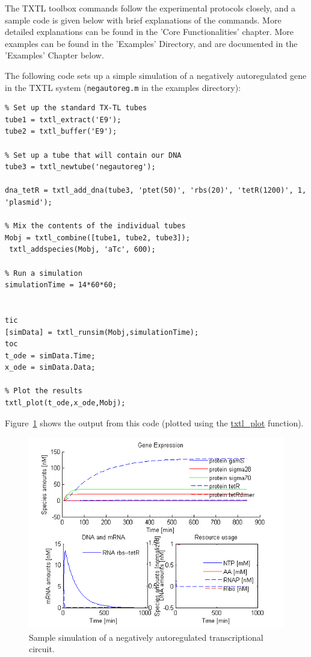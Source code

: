 The TXTL toolbox commands follow the experimental protocols closely,
and a sample code is given below with brief explanations
of the commands. More detailed explanations can be found in the
'Core Functionalities' chapter. More examples can be found in
the 'Examples' Directory, and are documented in the 'Examples' Chapter
below.

The following code sets up a simple simulation of a negatively
autoregulated gene in the TXTL system (\texttt{negautoreg.m} in the examples directory):
\begin{verbatim}
% Set up the standard TX-TL tubes
tube1 = txtl_extract('E9');
tube2 = txtl_buffer('E9');

% Set up a tube that will contain our DNA
tube3 = txtl_newtube('negautoreg');

dna_tetR = txtl_add_dna(tube3, 'ptet(50)', 'rbs(20)', 'tetR(1200)', 1, 'plasmid');

% Mix the contents of the individual tubes 
Mobj = txtl_combine([tube1, tube2, tube3]);
 txtl_addspecies(Mobj, 'aTc', 600);
 
% Run a simulation
simulationTime = 14*60*60;


tic
[simData] = txtl_runsim(Mobj,simulationTime);
toc
t_ode = simData.Time;
x_ode = simData.Data;

% Plot the results
txtl_plot(t_ode,x_ode,Mobj);
\end{verbatim}
Figure~\ref{fig:intro:negautoreg} shows the output from this code (plotted
using the \url{txtl_plot} function).
\begin{figure}
  \centering
  \includegraphics[width=\textwidth]{NegativeAutoregulationPlotActuallyProducedByCode.png}
  \caption{Sample simulation of a negatively autoregulated
  transcriptional circuit.}
  \label{fig:intro:negautoreg}
\end{figure}
